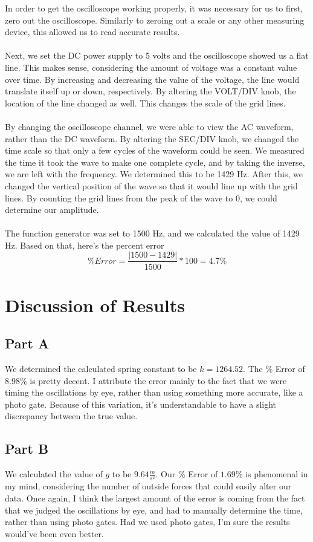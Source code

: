 \documentclass[titlepage]{article}
\begin{document}
In order to get the oscilloscope working properly, it was necessary for us to first, zero out the oscilloscope. Similarly to zeroing out a scale or any other measuring device, this allowed us to read accurate results.\\
\\
Next, we set the DC power supply to 5 volts and the oscilloscope showed us a flat line. This makes sense, considering the amount of voltage was a constant value over time. By increasing and decreasing the value of the voltage, the line would translate itself up or down, respectively. By altering the VOLT/DIV knob, the location of the line changed as well. This changes the scale of the grid lines.\\
\\
By changing the oscilloscope channel, we were able to view the AC waveform, rather than the DC waveform. By altering the SEC/DIV knob, we changed the time scale so that only a few cycles of the waveform could be seen. We measured the time it took the wave to make one complete cycle, and by taking the inverse, we are left with the frequency. We determined this to be 1429 Hz. After this, we changed the vertical position of the wave so that it would line up with the grid lines. By counting the grid lines from the peak of the wave to 0, we could determine our amplitude.\\
\\
The function generator was set to 1500 Hz, and we calculated the value of 1429 Hz. Based on that, here's the percent error
\[
	\% Error = \frac{|1500 - 1429|}{1500} * 100 = 4.7\%
\]

\section{Discussion of Results}\label{sec:discussion_of_results}
\subsection{Part A}\label{sub:part_a}
We determined the calculated spring constant to be $k = 1264.52$. The \% Error of $8.98\%$ is pretty decent. I attribute the error mainly to the fact that we were timing the oscillations by eye, rather than using something more accurate, like a photo gate. Because of this variation, it's understandable to have a slight discrepancy between the true value.

\subsection{Part B}\label{sub:part_b}
We calculated the value of $g$ to be $9.64 \frac{m}{s^2}$. Our \% Error of $1.69\%$ is phenomenal in my mind, considering the number of outside forces that could easily alter our data. Once again, I think the largest amount of the error is coming from the fact that we judged the oscillations by eye, and had to manually determine the time, rather than using photo gates. Had we used photo gates, I'm sure the results would've been even better.
\end{document}
